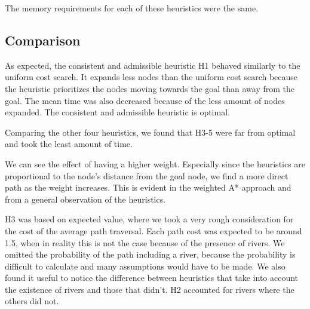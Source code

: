 The memory requirements for each of these heuristics were the same.

\subsection{Comparison}



As expected, the consistent and admissible heuristic H1 behaved similarly to the uniform cost search. It expands less nodes than the uniform cost search because the heuristic prioritizes the nodes moving towards the goal than away from the goal. The mean time was also decreased because of the less amount of nodes expanded.
The consistent and admissible heuristic is optimal.

Comparing the other four heuristics, we found that H3-5 were far from optimal and took the least amount of time.

We can see the effect of having a higher weight. Especially since the heuristics are proportional to the node's distance from the goal node, we find a more direct path as the weight increases. This is evident in the weighted A* approach and from a general observation of the heuristics.

H3 was based on expected value, where we took a very rough consideration for the cost of the average path traversal. Each path cost was expected to be around 1.5, when in reality this is not the case because of the presence of rivers. We omitted the probability of the path including a river, because the probability is difficult to calculate and many assumptions would have to be made. We also found it useful to notice the difference between heuristics that take into account the existence of rivers and those that didn't. H2 accounted for rivers where the others did not.
